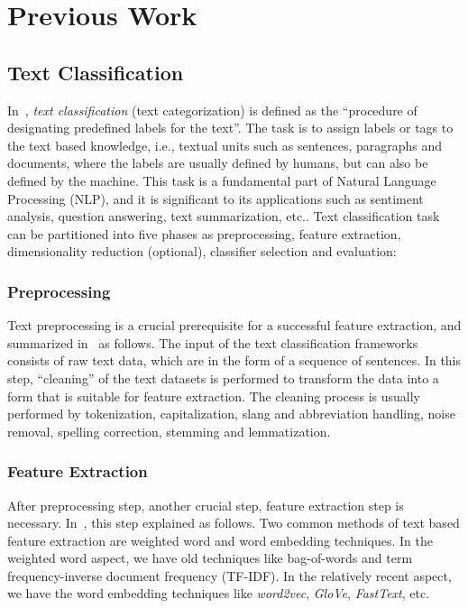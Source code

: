 \section{Previous Work}\label{sec:previous}
\subsection{Text Classification}\label{sec:TC}
In~\autocite{li20tc}, \emph{text classification} (text categorization) is defined as the ``procedure of designating predefined labels for the text''. The task is to assign labels or tags to the text based knowledge, i.e., textual units such as sentences, paragraphs and documents, where the labels are usually defined by humans, but can also be defined by the machine. This task is a fundamental part of Natural Language Processing (NLP), and it is significant to its applications such as sentiment analysis, question answering, text summarization, etc.. Text classification task can be partitioned into five phases as preprocessing, feature extraction, dimensionality reduction (optional), classifier selection and evaluation:

\subsubsection{Preprocessing}
Text preprocessing is a crucial prerequisite for a successful feature extraction, and summarized in~\autocite{kowsari19tc} as follows. The input of the text classification frameworks consists of raw text data, which are in the form of a sequence of sentences. In this step, ``cleaning'' of the text datasets is performed to transform the data into a form that is suitable for feature extraction. The cleaning process is usually performed by tokenization, capitalization, slang and abbreviation handling, noise removal, spelling correction, stemming and lemmatization.

\subsubsection{Feature Extraction}
After preprocessing step, another crucial step, feature extraction step is necessary. In~\autocite{kowsari19tc}, this step explained as follows. Two common methods of text based feature extraction are weighted word and word embedding techniques. In the weighted word aspect, we have old techniques like bag-of-words and term frequency-inverse document frequency (TF-IDF). In the relatively recent aspect, we have the word embedding techniques like \emph{word2vec}, \emph{GloVe}, \emph{FastText}, etc.

